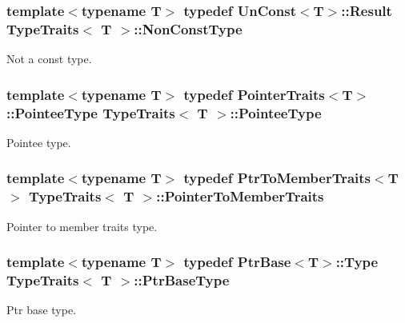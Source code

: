 \subsubsection[{\texorpdfstring{Non\+Const\+Type}{NonConstType}}]{\setlength{\rightskip}{0pt plus 5cm}template$<$typename T$>$ typedef {\bf Un\+Const}$<$T$>$\+::Result {\bf Type\+Traits}$<$ T $>$\+::{\bf Non\+Const\+Type}}\hypertarget{structTypeTraits_a8bddd7673f5ec6d1ea2f2291a46ebaa9}{}\label{structTypeTraits_a8bddd7673f5ec6d1ea2f2291a46ebaa9}
Not a const type. 
\subsubsection[{\texorpdfstring{Pointee\+Type}{PointeeType}}]{\setlength{\rightskip}{0pt plus 5cm}template$<$typename T$>$ typedef {\bf Pointer\+Traits}$<$T$>$\+::{\bf Pointee\+Type} {\bf Type\+Traits}$<$ T $>$\+::{\bf Pointee\+Type}}\hypertarget{structTypeTraits_a31db5eb2e960d2ee0850eca52c0d0a7c}{}\label{structTypeTraits_a31db5eb2e960d2ee0850eca52c0d0a7c}
Pointee type. 
\subsubsection[{\texorpdfstring{Pointer\+To\+Member\+Traits}{PointerToMemberTraits}}]{\setlength{\rightskip}{0pt plus 5cm}template$<$typename T$>$ typedef {\bf Ptr\+To\+Member\+Traits}$<$T$>$ {\bf Type\+Traits}$<$ T $>$\+::{\bf Pointer\+To\+Member\+Traits}}\hypertarget{structTypeTraits_af78bc5f4a44e34c23ff3175d2aa0a97f}{}\label{structTypeTraits_af78bc5f4a44e34c23ff3175d2aa0a97f}
Pointer to member traits type. 
\subsubsection[{\texorpdfstring{Ptr\+Base\+Type}{PtrBaseType}}]{\setlength{\rightskip}{0pt plus 5cm}template$<$typename T$>$ typedef {\bf Ptr\+Base}$<$T$>$\+::Type {\bf Type\+Traits}$<$ T $>$\+::{\bf Ptr\+Base\+Type}}\hypertarget{structTypeTraits_a29eb4cf54863f51b99a7545b1edd04e4}{}\label{structTypeTraits_a29eb4cf54863f51b99a7545b1edd04e4}
Ptr base type. 
